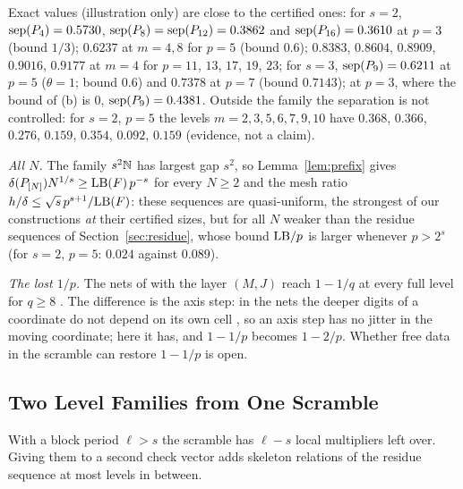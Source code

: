 \begin{remark}\label{rem:blockexact}
Exact values (illustration only) are close to the certified ones: for $s=2$, $\operatorname{sep}(P_4)=0.5730$, $\operatorname{sep}(P_8)=\operatorname{sep}(P_{12})=0.3862$ and $\operatorname{sep}(P_{16})=0.3610$ at $p=3$ (bound $1/3$); $0.6237$ at $m=4,8$ for $p=5$ (bound $0.6$); $0.8383$, $0.8604$, $0.8909$, $0.9016$, $0.9177$ at $m=4$ for $p=11$, $13$, $17$, $19$, $23$; for $s=3$, $\operatorname{sep}(P_9)=0.6211$ at $p=5$ ($\theta=1$; bound $0.6$) and $0.7378$ at $p=7$ (bound $0.7143$); at $p=3$, where the bound of (b) is $0$, $\operatorname{sep}(P_9)=0.4381$. Outside the family the separation is not controlled: for $s=2$, $p=5$ the levels $m=2,3,5,6,7,9,10$ have $0.368$, $0.366$, $0.276$, $0.159$, $0.354$, $0.092$, $0.159$ (evidence, not a claim).
\end{remark}

\emph{All $N$.} The family $s^2\mathbb{N}$ has largest gap $s^2$, so Lemma~\ref{lem:prefix} gives $\delta(P_{[N]})N^{1/s}\ge\mathrm{LB}(F)\,p^{-s}$ for every $N\ge2$ and the mesh ratio $h/\delta\le\sqrt s\,p^{s+1}/\mathrm{LB}(F)$: these sequences are quasi-uniform, the strongest of our constructions \emph{at} their certified sizes, but for all $N$ weaker than the residue sequences of Section~\ref{sec:residue}, whose bound $\mathrm{LB}/p$ is larger whenever $p>2^s$ (for $s=2$, $p=5$: $0.024$ against $0.089$).

\emph{The lost $1/p$.} The nets of \cite{Gru26geo} with the layer $(M,J)$ reach $1-1/q$ at every full level for $q\ge8$%
. The difference is the axis step: in the nets the deeper digits of a coordinate do not depend on its own cell%
, so an axis step has no jitter in the moving coordinate; here it has, and $1-1/p$ becomes $1-2/p$. Whether free data in the scramble can restore $1-1/p$ is open.

\subsection{Two Level Families from One Scramble}\label{sec:blocktwo}
With a block period $\ell>s$ the scramble has $\ell-s$ local multipliers left over. Giving them to a second check vector adds skeleton relations of the residue sequence at most levels in between.

